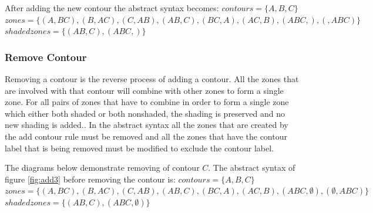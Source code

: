\documentclass[10pt, a4paper, titlepage]{article}
\begin{document}
After adding the new contour the abstract syntax becomes:\newline
$contours =  \lbrace A, B, C \rbrace $ \newline
$zones = \lbrace (A , BC) , (B , AC), (C, AB), (AB , C) , (BC , A) , (AC, B), (ABC , ), (  , ABC) \rbrace  $ \newline 
$shaded zones = \lbrace (AB , C), (ABC , ) \rbrace  $ \newline

\subsubsection{Remove Contour}
Removing a contour is the reverse process of adding a contour. All the zones that are involved with that contour will combine with other zones to form a single zone. For all pairs of zones that have to combine in order to form a single zone which either both shaded or both nonshaded, the shading is preserved and no new shading is added.\cite{Fish_2007}. In the abstract syntax all the zones that are created by the add contour rule must be removed and all the zones that have the contour label that is being removed must be modified to exclude the contour label.

The diagrams below demonstrate removing of contour $C$. The abstract syntax of figure \ref{fig:add3} before removing the contour is:\newline
$contours =  \lbrace A, B, C \rbrace $ \newline
$zones = \lbrace (A , BC) , (B , AC), (C, AB), (AB , C) , (BC , A) , (AC, B), (ABC ,\emptyset ), (\emptyset  , ABC) \rbrace  $ \newline 
$shaded zones = \lbrace (AB , C), (ABC , \emptyset) \rbrace  $ \newline
\end{document}

